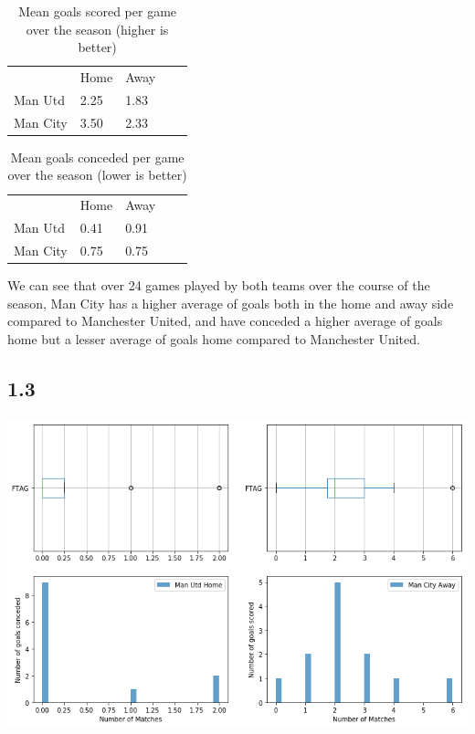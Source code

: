 \documentclass[12pt]{report}
\begin{document}
\begin{table}[ht]
\centering
\caption{Mean goals scored per game over the season (higher is better)}
\begin{tabular}{lllll}
         & Home & Away &  &  \\
Man Utd  & 2.25 & 1.83 &  &  \\
Man City & 3.50 & 2.33 &  &  \\
\end{tabular}
\end{table}

\begin{table}[ht]
\centering
\caption{Mean goals conceded per game over the season (lower is better)}
\begin{tabular}{lllll}
         & Home & Away &  &  \\
Man Utd  & 0.41 & 0.91 &  &  \\
Man City & 0.75 & 0.75 &  &  \\
\end{tabular}
\end{table}

\noindent
We can see that over 24 games played by both teams over the course of the season, Man City has a higher average of goals both in the home and away side compared to Manchester United, and have conceded a higher average of goals home but a lesser average of goals home compared to Manchester United. 

\newpage

\subsection{1.3}
\vspace{0.3cm}
\includegraphics[scale=0.7]{fig1}
\end{document}
